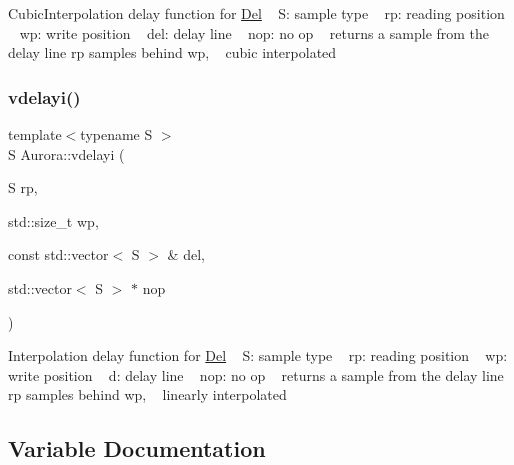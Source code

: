 Cubic\+Interpolation delay function for \hyperlink{class_aurora_1_1_del}{Del} ~\newline
S\+: sample type ~\newline
rp\+: reading position ~\newline
wp\+: write position ~\newline
del\+: delay line ~\newline
nop\+: no op ~\newline
returns a sample from the delay line rp samples behind wp, ~\newline
cubic interpolated \mbox{\label{namespace_aurora_a6882049233d07537b7f0bdff7d703306}} 
\subsubsection{\texorpdfstring{vdelayi()}{vdelayi()}}
{\footnotesize\ttfamily template$<$typename S $>$ \\
S Aurora\+::vdelayi (\begin{DoxyParamCaption}\item[{S}]{rp,  }\item[{std\+::size\+\_\+t}]{wp,  }\item[{const std\+::vector$<$ S $>$ \&}]{del,  }\item[{std\+::vector$<$ S $>$ $\ast$}]{nop }\end{DoxyParamCaption})\hspace{0.3cm}{\ttfamily [inline]}}

Interpolation delay function for \hyperlink{class_aurora_1_1_del}{Del} ~\newline
S\+: sample type ~\newline
rp\+: reading position ~\newline
wp\+: write position ~\newline
d\+: delay line ~\newline
nop\+: no op ~\newline
returns a sample from the delay line rp samples behind wp, ~\newline
linearly interpolated 

\subsection{Variable Documentation}
\mbox{\label{namespace_aurora_acb267dff62f74484893c2d5b679b78bf}} 
